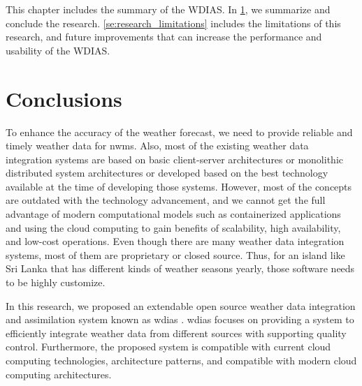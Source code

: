This chapter includes the summary of the WDIAS. In \cref{se:summary_conclusion}, we summarize and conclude the research. \cref{se:research_limitations} includes the limitations of this research, and future improvements that can increase the performance and usability of the WDIAS.

\section{Conclusions}
\label{se:summary_conclusion}

To enhance the accuracy of the weather forecast, we need to provide reliable and timely weather data for \acrshort{nwms}. Also, most of the existing weather data integration systems are based on basic client-server architectures or monolithic distributed system architectures or developed based on the best technology available at the time of developing those systems. However, most of the concepts are outdated with the technology advancement, and we cannot get the full advantage of modern computational models such as containerized applications and using the cloud computing to gain benefits of scalability, high availability, and low-cost operations. Even though there are many weather data integration systems, most of them are proprietary or closed source. Thus, for an island like Sri Lanka that has different kinds of weather seasons yearly, those software needs to be highly customize.

In this research, we proposed an extendable open source weather data integration and assimilation system known as \acrfull{wdias} \cite{KarunarathneWeatherCode}. \acrshort{wdias} focuses on providing a system to efficiently integrate weather data from different sources with supporting quality control. Furthermore, the proposed system is compatible with current cloud computing technologies, architecture patterns, and compatible with modern cloud computing architectures.

